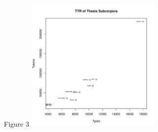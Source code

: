 \documentclass[12pt]{report}\usepackage[]{graphicx}\usepackage[]{color}
\newenvironment{knitrout}{}{} %
\begin{document}
\begin{spacing}{1.9}
Figure 3
\begin{knitrout}
\color{fgcolor}
\includegraphics[width=250,height=250]{figure/Figure_3-1} 

\end{knitrout}




\end{spacing}
\end{document}

